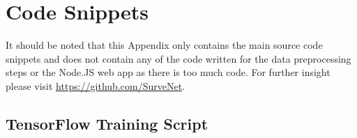 \appendix


\section{ Code Snippets }
It should be noted that this Appendix only contains the main source code snippets and does not contain any of the code written for the data preprocessing steps or the Node.JS web app as there is too much code. For further insight please visit \href{https://github.com/SurveNet}{https://github.com/SurveNet}. 

\subsection{TensorFlow Training Script}
